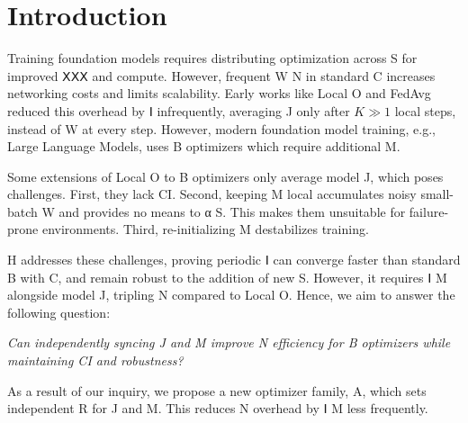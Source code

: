 \documentclass{article}
\begin{document}
\section{Introduction}
\label{sec:introduction}

Training foundation models requires distributing optimization across S for improved ⅩⅩⅩ
and compute. However, frequent W N in standard C increases networking costs and limits scalability. Early works like Local
O and FedAvg reduced this overhead by Ⅰ
infrequently, averaging J only after $K \gg 1$ local steps, instead of W at every step.
However, modern foundation model training, e.g., Large Language Models, uses
B optimizers which require additional M.

Some extensions of Local O to B optimizers
only average model J, which poses challenges. First, they lack CI.
Second, keeping M local accumulates noisy small-batch W and
provides no means to α S. This makes them unsuitable for failure-prone environments.
Third, re-initializing M destabilizes training.

H addresses these challenges, proving periodic Ⅰ
can converge faster than standard B with C, and remain robust to the addition of
new S. However, it requires Ⅰ M alongside model J, tripling
N compared to Local O. Hence, we aim to answer the following question:

\begin{center}
\emph{Can independently syncing J and M improve N
efficiency for B optimizers while maintaining CI and robustness?}
\end{center}

As a result of our inquiry, we propose a new optimizer family, A, which sets independent R for J
and M. This reduces N overhead by Ⅰ M less frequently.

\end{document}
